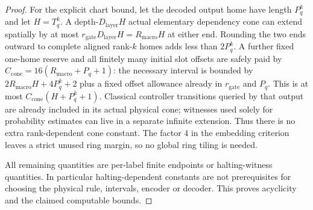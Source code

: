 \begin{proof}
For the explicit chart bound, let the decoded output home have length \(P_{q}^{k}\) and let \(H=T_{q}^{k}\). A depth-\(D_{\mathrm{layer}} H\) actual elementary dependency cone can extend spatially by at most \(r_{\mathrm{gate}} D_{\mathrm{layer}} H=R_{\mathrm{macro}} H\) at either end. Rounding the two ends outward to complete aligned rank-\(k\) homes adds less than \(2P_{q}^{k}\). A further fixed one-home reserve and all finitely many initial slot offsets are safely paid by \(C_{\mathrm{cone}}=16(R_{\mathrm{macro}}+P_{q}+1)\): the necessary interval is bounded by \(2R_{\mathrm{macro}} H+4P_{q}^{k}+2\) plus a fixed offset allowance already in \(r_{\mathrm{gate}}\) and \(P_{q}\). This is at most \(C_{\mathrm{cone}}(H+P_{q}^{k}+1)\). Classical controller transitions queried by that output are already included in its actual physical cone; witnesses used solely for probability estimates can live in a separate infinite extension. Thus there is no extra rank-dependent cone constant. The factor 4 in the embedding criterion leaves a strict unused ring margin, so no global ring tiling is needed.

All remaining quantities are per-label finite endpoints or halting-witness quantities. In particular halting-dependent constants are not prerequisites for choosing the physical rule, intervals, encoder or decoder. This proves acyclicity and the claimed computable bounds. 
\end{proof}
